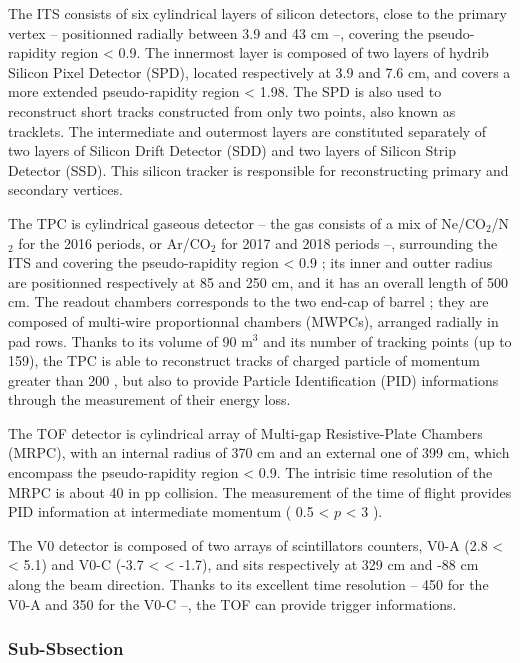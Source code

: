 The ITS consists of six cylindrical layers of silicon detectors, close to the primary vertex -- positionned radially between 3.9 and 43 cm --, covering the pseudo-rapidity region \abspseudorap < 0.9. The innermost layer is composed of two layers of hydrib Silicon Pixel Detector (SPD), located respectively at 3.9 and 7.6 cm, and covers a more extended pseudo-rapidity region \abspseudorap < 1.98. The SPD is also used to reconstruct short tracks constructed from only two points, also known as tracklets. The intermediate and outermost layers are constituted separately of two layers of Silicon Drift Detector (SDD) and two layers of Silicon Strip Detector (SSD). This silicon tracker is responsible for reconstructing primary and secondary vertices. 

The TPC is cylindrical gaseous detector -- the gas consists of a mix of Ne/CO$_2$/N$_2$ for the 2016 periods, or Ar/CO$_2$ for 2017 and 2018 periods --, surrounding the ITS and covering the pseudo-rapidity region \abspseudorap < 0.9 ; its inner and outter radius are positionned respectively at 85 and 250 cm, and it has an overall length of 500 cm. The readout chambers corresponds to the two end-cap of barrel ; they are composed of multi-wire proportionnal chambers (MWPCs), arranged radially in pad rows. Thanks to its volume of 90 m$^3$ and its number of tracking points (up to 159), the TPC is able to reconstruct tracks of charged particle of momentum greater than 200 \mmom, but also to provide Particle Identification (PID) informations through the measurement of their energy loss.

The TOF detector is cylindrical array of Multi-gap Resistive-Plate Chambers (MRPC), with an internal radius of 370 cm and an external one of 399 cm, which encompass the pseudo-rapidity region \abspseudorap < 0.9. The intrisic time resolution of the MRPC is about 40 \psec in pp collision. The measurement of the time of flight provides PID information at intermediate momentum ( 0.5 < $p$ < 3 \gmom ).

The V0 detector is composed of two arrays of scintillators counters, V0-A (2.8 < \pseudorap < 5.1) and V0-C (-3.7 < \pseudorap < -1.7), and sits respectively at 329 cm and -88 cm along the beam direction. Thanks to its excellent time resolution -- 450 \psec for the V0-A and 350 \psec for the V0-C --, the TOF can provide trigger informations.

\subsubsection{Sub-Sbsection}